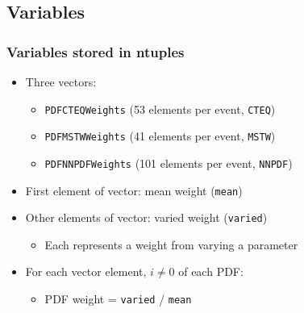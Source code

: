 \documentclass[bigger]{beamer}
\begin{document}
\subsection{Variables}
\label{sec-2-1}
\begin{frame}
\frametitle{Variables stored in ntuples}
\label{sec-2-1-1}
\begin{itemize}

\item Three vectors:
\label{sec-2-1-1-1}%
\begin{itemize}

\item \texttt{PDFCTEQWeights} (53 elements per event, \texttt{CTEQ})
\label{sec-2-1-1-1-1}%

\item \texttt{PDFMSTWWeights} (41 elements per event, \texttt{MSTW})
\label{sec-2-1-1-1-2}%

\item \texttt{PDFNNPDFWeights} (101 elements per event, \texttt{NNPDF})
\label{sec-2-1-1-1-3}%
\end{itemize} %

\item First element of vector: mean weight (\texttt{mean})
\label{sec-2-1-1-2}%

\item Other elements of vector: varied weight (\texttt{varied})
\label{sec-2-1-1-3}%
\begin{itemize}

\item Each represents a weight from varying a parameter
\label{sec-2-1-1-3-1}%
\end{itemize} %

\item For each vector element, $i \neq 0$ of each PDF:
\label{sec-2-1-1-4}%
\begin{itemize}

\item PDF weight = \texttt{varied} / \texttt{mean}
\label{sec-2-1-1-4-1}%
\end{itemize} %
\end{itemize} %
\end{frame}
\end{document}

